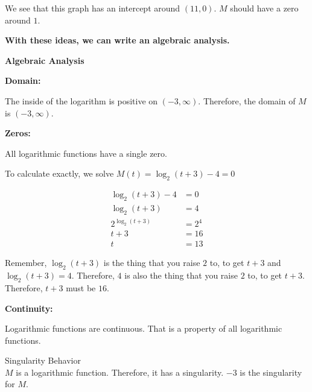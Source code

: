 \documentclass{ximera}
\begin{document}
\begin{formuala}
\begin{example}
\begin{image}
\end{image}


We see that this graph has an intercept around $(11, 0)$. $M$ should have a zero around $1$.


\textbf{\textcolor{red!75!green}{With these ideas, we can write an algebraic analysis. }} 

\textbf{\textcolor{purple!65!blue}{Algebraic Analysis}}






\textbf{Domain:}  

The inside of the logarithm is positive on $(-3, \infty)$.  Therefore, the domain of $M$ is $(-3, \infty)$. 


\textbf{Zeros:}  

All logarithmic functions have a single zero.  

To calculate exactly, we solve $M(t) = \log_2(t+3) - 4 = 0$ 


\begin{align*}
\log_2(t+3) - 4 & = 0 \\
\log_2(t+3) & = 4 \\
2^{\log_2(t+3)} & = 2^4 \\
t+3& = 16 \\
t & = 13
\end{align*}


Remember, $\log_2(t+3)$ is the thing that you raise $2$ to, to get $t+3$ and $\log_2(t+3) = 4$.  Therefore, $4$ is also the thing that you raise $2$ to, to get $t+3$. Therefore, $t+3$ must be $16$.




\textbf{Continuity:}  


Logarithmic functions are continuous.  That is a property of all logarithmic functions. 


Singularity Behavior \\
$M$ is a logarithmic function. Therefore, it has a singularity.  $-3$ is the singularity for $M$.


\end{example}
\end{formuala}
\end{document}
